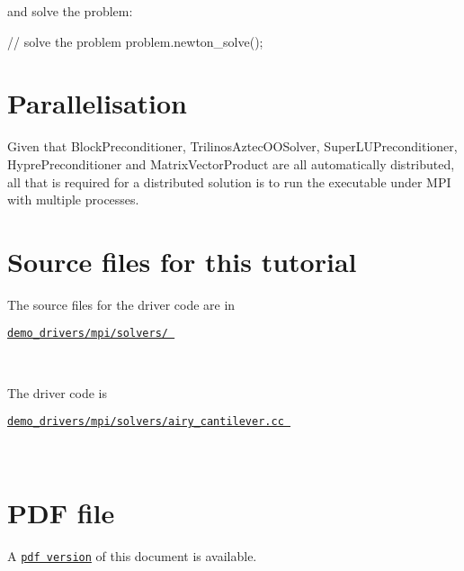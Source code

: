 and solve the problem\+:

 
\begin{DoxyCodeInclude}
 \textcolor{comment}{// solve the problem}
 problem.newton\_solve();

\end{DoxyCodeInclude}
\hypertarget{index_Parallelisation}{}\section{Parallelisation}\label{index_Parallelisation}
Given that {\ttfamily Block\+Preconditioner}, {\ttfamily Trilinos\+Aztec\+O\+O\+Solver}, {\ttfamily Super\+L\+U\+Preconditioner}, {\ttfamily Hypre\+Preconditioner} and {\ttfamily Matrix\+Vector\+Product} are all automatically distributed, all that is required for a distributed solution is to run the executable under M\+PI with multiple processes.



 

\hypertarget{index_sources}{}\section{Source files for this tutorial}\label{index_sources}

\begin{DoxyItemize}
\item The source files for the driver code are in \begin{center} \href{../../../../demo_drivers/mpi/solvers/}{\tt demo\+\_\+drivers/mpi/solvers/ } \end{center}  ~\newline

\item The driver code is \begin{center} \href{../../../../demo_drivers/mpi/solvers/airy_cantilever.cc}{\tt demo\+\_\+drivers/mpi/solvers/airy\+\_\+cantilever.\+cc } \end{center}  ~\newline

\end{DoxyItemize}



 

 \hypertarget{index_pdf}{}\section{P\+D\+F file}\label{index_pdf}
A \href{../latex/refman.pdf}{\tt pdf version} of this document is available. 
